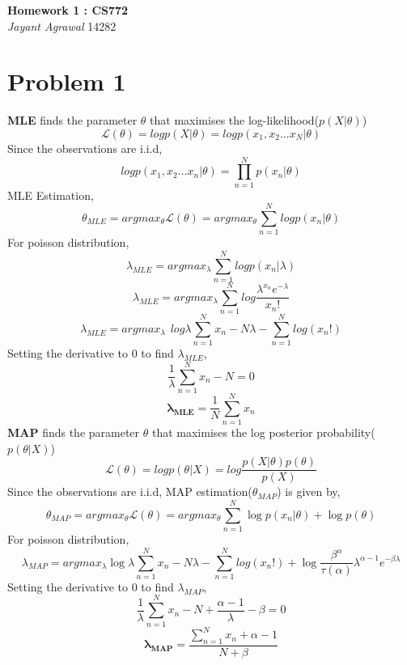 \documentclass{article}
\begin{document}

\begin{center}
\textbf{\huge Homework 1 : CS772} \\
\vspace{5pt}
\textit{\Large Jayant Agrawal}         14282
\end{center}

\section*{Problem 1}
\textbf{MLE} finds the parameter $\theta$ that maximises the log-likelihood($p(X|\theta)$)
$$\mathcal{L}(\theta) = log p(X|\theta) = log p(x_1, x_2 ...x_N | \theta)$$
Since the observations are i.i.d,
$$log p(x_1, x_2 ...x_n | \theta) = \prod_{n=1}^N p(x_n| \theta)$$
MLE Estimation,
$$\theta_{MLE} = argmax_{\theta} \mathcal{L}(\theta) = argmax_{\theta} \sum_{n=1}^N logp(x_n|\theta)$$
For poisson distribution,
$$\lambda_{MLE} = argmax_{\lambda} \sum_{n=1}^N logp(x_n|\lambda)$$
$$\lambda_{MLE} = argmax_{\lambda} \sum_{n=1}^N log\frac{\lambda^{x_n}e^{-\lambda}}{x_n!}$$
$$\lambda_{MLE} = argmax_{\lambda} \hspace{5pt} log\lambda\sum_{n=1}^Nx_n - N\lambda - \sum_{n=1}^Nlog(x_n!)$$
Setting the derivative to 0 to find $\lambda_{MLE}$,
$$\frac{1}{\lambda}\sum_{n=1}^Nx_n - N = 0$$
$$\mathbf{\lambda_{MLE}} = \frac{1}{N}\sum_{n=1}^Nx_n$$
\textbf{MAP} finds the parameter $\theta$ that maximises the log posterior probability($p(\theta|X)$)
$$\mathcal{L}(\theta) = log p(\theta|X) = log\frac{p(X|\theta)p(\theta)}{p(X)} $$
Since the observations are i.i.d, MAP estimation($\theta_{MAP}$) is given by,
$$\theta_{MAP} = argmax_{\theta} \mathcal{L}(\theta) = argmax_{\theta}\sum_{n=1}^N\log{p(x_n|\theta)}+ \log{p(\theta)} $$
For poisson distribution,
$$\lambda_{MAP} = argmax_{\lambda} \log{\lambda}\sum_{n=1}^Nx_n- N\lambda - \sum_{n=1}^Nlog(x_n!) + \log{\frac{\beta^\alpha}{\tau(\alpha)} \lambda^{\alpha-1} e^{-\beta\lambda}}$$
Setting the derivative to 0 to find $\lambda_{MAP}$,
$$\frac{1}{\lambda}\sum_{n=1}^Nx_n - N + \frac{\alpha-1}{\lambda}- \beta= 0$$
$$\mathbf{\lambda_{MAP}} = \frac{\sum_{n=1}^Nx_n + \alpha-1}{N+\beta}$$
\end{document}
